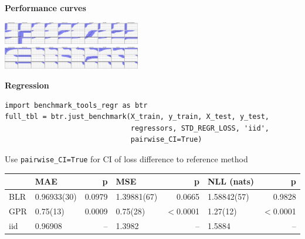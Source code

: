 \documentclass[a0,landscape]{a0poster}
\newcommand{\code}{\texttt}
\newcommand{\sectionx}{\textbf}
\begin{document}
\begin{multicols}{2}
\sectionx{Performance curves}

\includegraphics[width=0.45\textwidth]{AUC.png}\\
\includegraphics[width=0.45\textwidth]{AP.png}

\sectionx{Regression}

\begin{verbatim}
import benchmark_tools_regr as btr
full_tbl = btr.just_benchmark(X_train, y_train, X_test, y_test,
                              regressors, STD_REGR_LOSS, 'iid',
                              pairwise_CI=True)
\end{verbatim}
Use \code{pairwise\_CI=True} for CI of loss difference to reference method

\begin{tabular}{|l|l|r|l|r|l|r|}
\toprule
{}  &        {MAE} &     {p} &        {MSE} &      {p} & {NLL (nats)} &      {p} \\
\midrule
BLR &  0.96933(30) &  0.0979 &  1.39881(67) &   0.0665 &  1.58842(57) &   0.9828 \\
GPR &  0.75(13)    &  0.0009 &  0.75(28)    &  $<$0.0001 &  1.27(12)    &  $<$0.0001 \\
iid &  0.96908     &    {--} &  1.3982      &     {--} &  1.5884      &     {--} \\
\bottomrule
\end{tabular}

\end{multicols}
\end{document}

